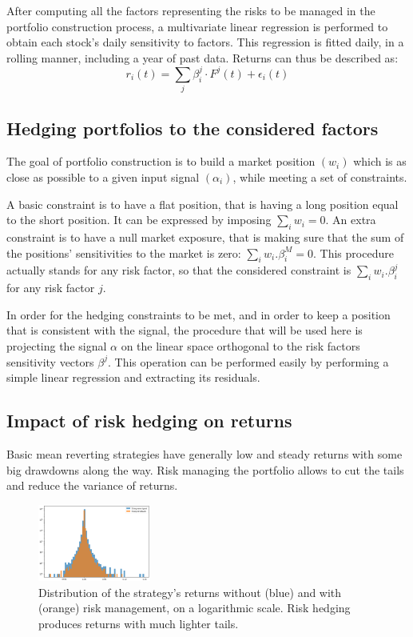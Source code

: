 \documentclass[letterpaper, 10 pt, conference]{ieeeconf}  %
\begin{document}
After computing all the factors representing the risks to be managed in the portfolio construction process, a multivariate linear regression is performed to obtain each stock's daily sensitivity to factors. This regression is fitted daily, in a rolling manner, including a year of past data. Returns can thus be described as: $$r_i(t) = \sum_j \beta^j_i \cdot F^j(t) + \epsilon_i(t)$$

\subsection{Hedging portfolios to the considered factors}

The goal of portfolio construction is to build a market position $(w_i)$ which is as close as possible to a given input signal $(\alpha_i)$, while meeting a set of constraints. 

A basic constraint is to have a flat position, that is having a long position equal to the short position. It can be expressed by imposing $\sum_i w_i = 0$. An extra constraint is to have a null market exposure, that is making sure that the sum of the positions' sensitivities to the market is zero: $\sum_i w_i.\beta^M_i = 0$. This procedure actually stands for any risk factor, so that the considered constraint is $\sum_i w_i.\beta_i^j$ for any risk factor $j$.

In order for the hedging constraints to be met, and in order to keep a position that is consistent with the signal, the procedure that will be used here is projecting the signal $\alpha$ on the linear space orthogonal to the risk factors sensitivity vectors $\beta^j$. This operation can be performed easily by performing a simple linear regression and extracting its residuals.

\subsection{Impact of risk hedging on returns}

Basic mean reverting strategies have generally low and steady returns with some big drawdowns along the way. Risk managing the portfolio allows to cut the tails and reduce the variance of returns. 


\begin{figure}[thpb]
\centering
\includegraphics[width=140px]{img/diff_histo_returns.png}
\caption{Distribution of the strategy's returns without (blue) and with (orange) risk management, on a logarithmic scale. Risk hedging produces returns with much lighter tails.}
\label{histodiff}
\end{figure}
\end{document}
